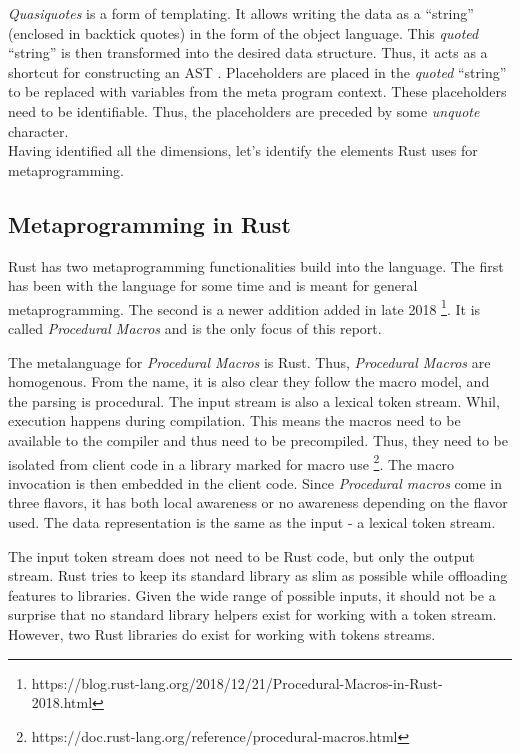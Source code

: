 \textit{Quasiquotes} is a form of templating.
It allows writing the data as a ``string'' (enclosed in backtick quotes) in the form of the object language.
This \textit{quoted} ``string'' is then transformed into the desired data structure.
Thus, it acts as a shortcut for constructing an AST \cite{lilis_15_01}.
Placeholders are placed in the \textit{quoted} ``string'' to be replaced with variables from the meta program context.
These placeholders need to be identifiable.
Thus, the placeholders are preceded by some \textit{unquote} character. \cite{bawden_99_01} \\

Having identified all the dimensions, let's identify the elements Rust uses for metaprogramming.

\subsection{Metaprogramming in Rust}
Rust has two metaprogramming functionalities build into the language.
The first has been with the language for some time and is meant for general metaprogramming.
The second is a newer addition added in late 2018 \footnote{https://blog.rust-lang.org/2018/12/21/Procedural-Macros-in-Rust-2018.html}.
It is called \textit{Procedural Macros} and is the only focus of this report. \cite{klabnik_2019_01}

The metalanguage for \textit{Procedural Macros} is Rust.
Thus, \textit{Procedural Macros} are homogenous.
From the name, it is also clear they follow the macro model, and the parsing is procedural.
The input stream is also a lexical token stream.
Whil, execution happens during compilation.
This means the macros need to be available to the compiler and thus need to be precompiled.
Thus, they need to be isolated from client code in a library marked for macro use \footnote{https://doc.rust-lang.org/reference/procedural-macros.html}.
The macro invocation is then embedded in the client code.
Since \textit{Procedural macros} come in three flavors, it has both local awareness or no awareness depending on the flavor used.
The data representation is the same as the input - a lexical token stream.

The input token stream does not need to be Rust code, but only the output stream.
Rust tries to keep its standard library as slim as possible while offloading features to libraries.
Given the wide range of possible inputs, it should not be a surprise that no standard library helpers exist for working with a token stream.
However, two Rust libraries do exist for working with tokens streams.

